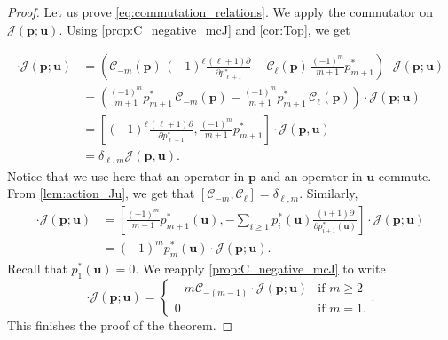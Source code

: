 \documentclass[10pt,a4paper]{amsart}
\newcommand{\C}{\mathcal C}
\newcommand{\bfp}{\boldsymbol{p}}
\newcommand{\bfu}{\boldsymbol{u}}
\newcommand{\mcJ}{\mathcal{J}}
\begin{document}
\begin{proof}
Let us prove \cref{eq:commutation_relations}. We apply the commutator on $\mcJ(\bfp;\bfu)$. 
Using \cref{prop:C_negative_mcJ} and \cref{cor:Top}, we get

\begin{align*}
  [\C_{-m}(\bfp),\C_\ell(\bfp)]\cdot \mcJ(\bfp;\bfu)
  &=\left(\C_{-m}(\bfp)\,(-1)^\ell\frac{(\ell+1)\partial}{\partial p^*_{\ell+1}} -\C_\ell(\bfp)\,\frac{(-1)^m}{m+1}p^*_{m+1}\right)\cdot \mcJ(\bfp;\bfu)\\
  &=\left(\frac{(-1)^m}{m+1}p^*_{m+1}\,\C_{-m}(\bfp) -\frac{(-1)^m}{m+1}p^*_{m+1}\,\C_\ell(\bfp)\right)\cdot \mcJ(\bfp;\bfu)\\
  &=\left[(-1)^\ell\frac{(\ell+1)\partial}{\partial p^*_{\ell+1}} ,\frac{(-1)^m}{m+1}p^*_{m+1}\right]\cdot \mcJ(\bfp,\bfu)\\
  &=\delta_{\ell,m}\mcJ(\bfp,\bfu).  
\end{align*}
Notice that we use here that an operator in $\bfp$ and an operator in $\bfu$ commute. From \cref{lem:action_Ju}, we get that $[\C_{-m},\C_\ell]=\delta_{\ell,m}.$ Similarly,
\begin{align*}
        [\C_0(\bfp),\C_{-m}(\bfp)]\cdot \mcJ(\bfp;\bfu)
        &=\left[\frac{(-1)^m}{m+1}p^*_{m+1}(\bfu),-\sum_{i\geq 1}p_i^*(\bfu)\frac{(i+1)\partial}{\partial p^*_{i+1}(\bfu)}\right]\cdot \mcJ(\bfp;\bfu)\\
        &=(-1)^mp^*_{m}(\bfu)\cdot \mcJ(\bfp;\bfu).
\end{align*}
Recall that $p^*_1(\bfu)=0$. We reapply \cref{prop:C_negative_mcJ} to write
\begin{equation*}
    [\C_0(\bfp),\C_{-m}(\bfp)]\cdot \mcJ(\bfp;\bfu)=
    \begin{cases}
        -m\C_{-(m-1)}\cdot \mcJ(\bfp;\bfu)&\text{if }m\geq 2\\
        0&\text{if }m=1.
    \end{cases}.
\end{equation*}
This finishes the proof of the theorem.
\end{proof}
\end{document}
